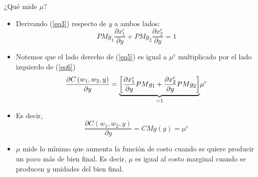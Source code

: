\documentclass{beamer}
\theoremstyle{definition}
\begin{document}
\begin{frame}{¿Qué mide $\mu$?}\small
\begin{itemize}
\item Derivando (\ref{eq3}) respecto de $y$ a ambos lados:
\begin{equation}
PMg_{1}\frac{\partial x_{1}^{c}}{\partial y}+PMg_{2}\frac{\partial x_{2}^{c}}{\partial y}=1 \label{eq6}
\end{equation}
\item Notemos que el lado derecho de (\ref{eq5}) es igual a $\mu^c$ multiplicado por el lado izquierdo de (\ref{eq6})
\begin{equation*}
\frac{\partial C\left( w_{1},w_{2},y\right) }{\partial y}=\underset{=1}{%
\underbrace{\left[ \frac{\partial x_{1}^{c}}{\partial y}PMg_{1}+\frac{%
\partial x_{2}^{c}}{\partial y}PMg_{2}\right] }}\mu ^{c}
\end{equation*}
\item Es decir,
\begin{equation*}
\frac{\partial C\left( w_{1},w_{2},y\right) }{\partial y}=CMg(y)=\mu^{c} 
\end{equation*}
\item $\mu$ mide lo mínimo que aumenta la función de costo cuando se quiere producir un poco más de bien final. Es decir, $\mu$ es igual al costo marginal cuando se producen $y$ unidades del bien final.
\end{itemize}
\end{frame}


\end{document}
